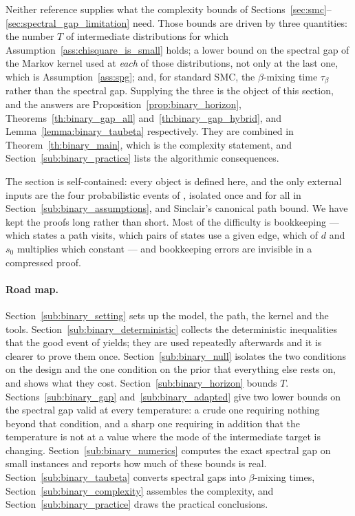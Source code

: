 \documentclass[aos]{imsart}%
\theoremstyle{plain}
\theoremstyle{definition}
\begin{document}
    Neither reference supplies what the complexity bounds of
    Sections~\ref{sec:smc}--\ref{sec:spectral_gap_limitation} need. Those bounds
    are driven by three quantities: the number $T$ of intermediate
    distributions for which Assumption~\ref{ass:chisquare_is_small} holds; a
    lower bound on the spectral gap of the Markov kernel used at \emph{each} of
    those distributions, not only at the last one, which is
    Assumption~\ref{ass:spg}; and, for standard SMC, the $\beta$-mixing time
    $\tau_\beta$ rather than the spectral gap. Supplying the three is the object
    of this section, and the answers are
    Proposition~\ref{prop:binary_horizon}, Theorems~\ref{th:binary_gap_all}
    and~\ref{th:binary_gap_hybrid}, and Lemma~\ref{lemma:binary_taubeta}
    respectively. They are combined in Theorem~\ref{th:binary_main}, which is
    the complexity statement, and Section~\ref{sub:binary_practice} lists the
    algorithmic consequences.

    The section is self-contained: every object is defined here, and the only
    external inputs are the four probabilistic events of
    \citet{YangWainwrightJordan2016}, isolated once and for all in
    Section~\ref{sub:binary_assumptions}, and Sinclair's canonical path bound.
    We have kept the proofs long rather than short. Most of the difficulty is
    bookkeeping --- which states a path visits, which pairs of states use a
    given edge, which of $d$ and $s_0$ multiplies which constant --- and
    bookkeeping errors are invisible in a compressed proof.

    \paragraph{Road map.}
    Section~\ref{sub:binary_setting} sets up the model, the path, the kernel and
    the tools. Section~\ref{sub:binary_deterministic} collects the deterministic
    inequalities that the good event of \citet{YangWainwrightJordan2016} yields;
    they are used repeatedly afterwards and it is clearer to prove them once.
    Section~\ref{sub:binary_null} isolates the two conditions on the design
    and the one condition on the prior that everything else rests on, and shows
    what they cost.
    Section~\ref{sub:binary_horizon} bounds $T$.
    Sections~\ref{sub:binary_gap} and~\ref{sub:binary_adapted} give
    two lower bounds on the spectral gap valid at every temperature: a crude one
    requiring nothing beyond that condition, and a sharp one requiring in
    addition that the temperature is not at a value where the mode of the
    intermediate target is changing. Section~\ref{sub:binary_numerics} computes
    the exact spectral gap on small instances and reports how much of these
    bounds is real. Section~\ref{sub:binary_taubeta} converts
    spectral gaps into $\beta$-mixing times, Section~\ref{sub:binary_complexity}
    assembles the complexity, and Section~\ref{sub:binary_practice} draws the
    practical conclusions.
\end{document}
